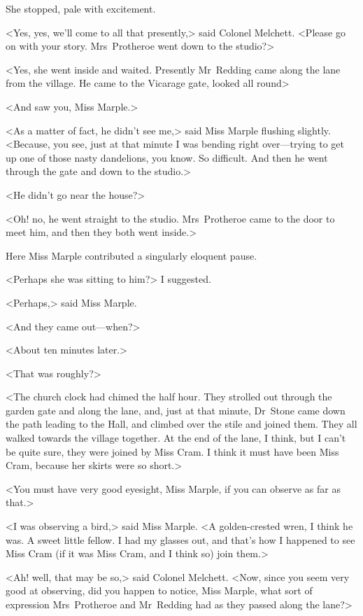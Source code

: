 She stopped, pale with excitement.

<Yes, yes, we'll come to all that presently,> said Colonel Melchett. <Please go on with your story. Mrs~Protheroe went down to the studio?>

<Yes, she went inside and waited. Presently Mr~Redding came along the lane from the village. He came to the Vicarage gate, looked all round\longdash>

<And saw you, Miss Marple.>

<As a matter of fact, he didn't see me,> said Miss Marple flushing slightly. <Because, you see, just at that minute I was bending right over—trying to get up one of those nasty dandelions, you know. So difficult. And then he went through the gate and down to the studio.>

<He didn't go near the house?>

<Oh! no, he went straight to the studio. Mrs~Protheroe came to the door to meet him, and then they both went inside.>

Here Miss Marple contributed a singularly eloquent pause.

<Perhaps she was sitting to him?> I suggested.

<Perhaps,> said Miss Marple.

<And they came out—when?>

<About ten minutes later.>

<That was roughly?>

<The church clock had chimed the half hour. They strolled out through the garden gate and along the lane, and, just at that minute, Dr~Stone came down the path leading to the Hall, and climbed over the stile and joined them. They all walked towards the village together. At the end of the lane, I think, but I can't be quite sure, they were joined by Miss Cram. I think it must have been Miss Cram, because her skirts were so short.>

<You must have very good eyesight, Miss Marple, if you can observe as far as that.>

<I was observing a bird,> said Miss Marple. <A golden-crested wren, I think he was. A sweet little fellow. I had my glasses out, and that's how I happened to see Miss Cram (if it was Miss Cram, and I think so) join them.>

<Ah! well, that may be so,> said Colonel Melchett. <Now, since you seem very good at observing, did you happen to notice, Miss Marple, what sort of expression Mrs~Protheroe and Mr~Redding had as they passed along the lane?>

